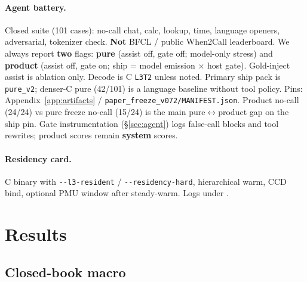 \documentclass[11pt,a4paper]{article}
\begin{document}
\paragraph{Agent battery.}
Closed suite (101 cases): no-call chat, calc, lookup, time, language openers, adversarial, tokenizer check.
\textbf{Not} BFCL / public When2Call leaderboard.
We always report \textbf{two} flags: \textbf{pure} (assist off, gate off; model-only stress) and \textbf{product} (assist off, gate on; ship = model emission $\times$ host gate).
Gold-inject assist is ablation only.
Decode is C \texttt{L3T2} unless noted.
Primary ship pack is \texttt{pure\_v2}; denser-C pure (42/101) is a language baseline without tool policy.
Pins: Appendix~\ref{app:artifacts} / \texttt{paper\_freeze\_v072/MANIFEST.json}.
Product no-call (24/24) vs pure freeze no-call (15/24) is the main pure$\leftrightarrow$product gap on the ship pin. Gate instrumentation (\S\ref{sec:agent}) logs false-call blocks and tool rewrites; product scores remain \textbf{system} scores.

\paragraph{Residency card.}
C binary with \texttt{{-{-}}l3-resident} / \texttt{{-{-}}residency-hard}, hierarchical warm, CCD bind, optional PMU window after steady-warm.
Logs under .

\section{Results}
\label{sec:results}

\subsection{Closed-book macro}
\label{sec:macro}
\end{document}
